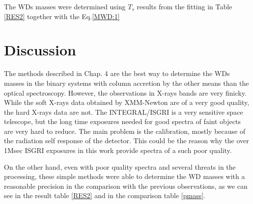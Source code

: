 \documentclass[oneside,a4paper,11pt]{report}
\begin{document}
The WDs masses were determined using $T_s$ results from the fitting in Table \ref{RES2} together with the Eq.\eqref{MWD:1}

\section{Discussion}
The methods described in Chap. 4 are the best way to determine the WDs masses in the binary systems with 
column accretion by the other means than the optical spectroscopy. However, the observations in X-rays bands are very 
finicky. While the soft X-rays data obtained by XMM-Newton are of a very good quality, the hard X-rays 
data are not. The INTEGRAL/ISGRI is a very sensitive space telescope, but the long time exposures needed 
for good spectra of faint objects are very hard to reduce. The main problem is the calibration, mostly 
because of the radiation self response of the detector. This could be the reason why the over 1Msec ISGRI 
exposures in this work provide spectra of a such poor quality. 

On the other hand, even with poor quality spectra and several threats in the processing, these 
simple methods were able to determine the WD masses with a reasonable precision in the comparison with the previous
 observations, as we can see in the result table \ref{RES2} and in the comparison table \ref{pmass}.
\end{document}
